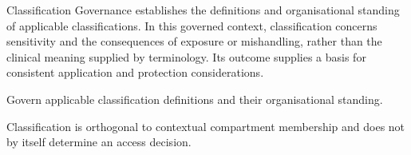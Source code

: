 Classification Governance establishes the definitions and organisational standing of applicable classifications. In this governed context, classification concerns sensitivity and the consequences of exposure or mishandling, rather than the clinical meaning supplied by terminology. Its outcome supplies a basis for consistent application and protection considerations.



Govern applicable classification definitions and their organisational standing.



Classification is orthogonal to contextual compartment membership and does not by itself determine an access decision.


